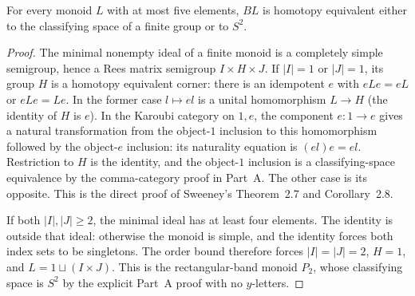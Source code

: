 \begin{lemma}
\label{B:smallmonoids}
For every monoid $L$ with at most five elements, $BL$ is homotopy
equivalent either to the classifying space of a finite group or to $S^2$.
\end{lemma}
\begin{proof}
The minimal nonempty ideal of a finite monoid is a completely simple
semigroup, hence a Rees matrix semigroup $I\times H\times J$.
If $|I|=1$ or $|J|=1$, its group $H$ is a homotopy equivalent
corner: there is an idempotent $e$ with $eLe=eL$ or $eLe=Le$.
In the former case $l\mapsto el$ is a unital homomorphism $L\to H$
(the identity of $H$ is $e$). In the Karoubi category on $1,e$,
the component $e:1\to e$ gives a natural transformation from the
object-$1$ inclusion to this homomorphism followed by the object-$e$
inclusion: its naturality equation is $(el)e=el$. Restriction to
$H$ is the identity, and the object-$1$ inclusion is a classifying-space
equivalence by the comma-category proof in Part~A. The other case
is its opposite. This is
the direct proof of Sweeney's Theorem~2.7 and Corollary~2.8.

If both $|I|,|J|\geq2$, the minimal ideal has at least four elements.
The identity is outside that ideal: otherwise the monoid is simple,
and the identity forces both index sets to be singletons. The order
bound therefore forces $|I|=|J|=2$, $H=1$, and $L=1\sqcup(I\times J)$.
This is the rectangular-band monoid $P_2$, whose classifying space
is $S^2$ by the explicit Part~A proof with no $y$-letters.
\end{proof}

